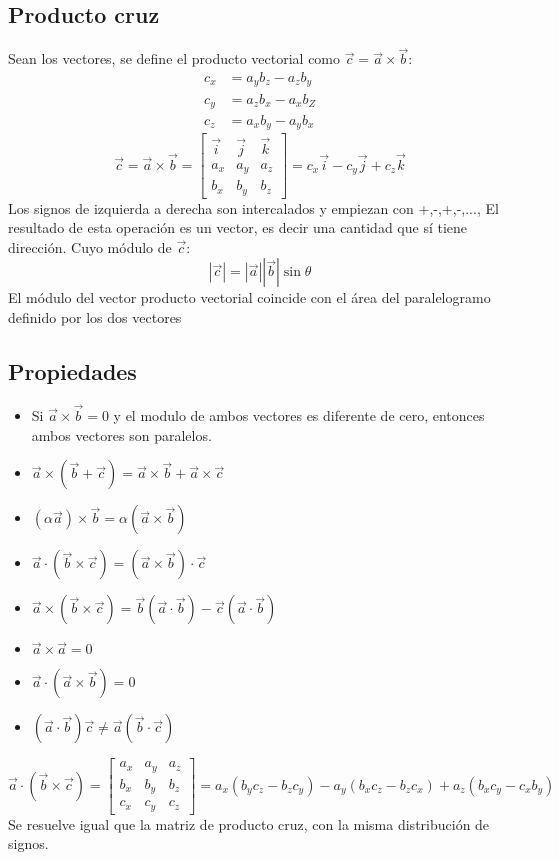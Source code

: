\documentclass[
	11pt, %
	fleqn, %
	a4paper, %
]{LegrandOrangeBook}
\begin{document}
\subsection{Producto cruz}
Sean los vectores, se define el producto vectorial como $\vec{c}=\vec{a}\times\vec{b}$:
\begin{align*}
c_x&=a_yb_z - a_zb_y\\
c_y&=a_zb_x - a_xb_Z\\
c_z&=a_xb_y - a_yb_x
\end{align*}
\begin{equation}
\vec{c}=\vec{a}\times\vec{b}=
\begin{bmatrix}
     \vec{i} & \vec{j} & \vec{k}\\
     a_x & a_y & a_z\\
     b_x & b_y & b_z
   \end{bmatrix}
=c_x\vec{i}-c_y\vec{j}+c_z\vec{k}
\end{equation}
Los signos de izquierda a derecha son intercalados y empiezan con +,-,+,-,...,
El resultado de esta operación es un vector, es decir una cantidad que sí tiene dirección. 
Cuyo módulo de $\vec{c}$:
\begin{equation}
|\vec{c}|=|\vec{a}||\vec{b}|\sin\theta
\end{equation}
El módulo del vector producto vectorial coincide con el área del paralelogramo definido por los dos vectores
\subsection{Propiedades}
\begin{itemize}
\item Si $\vec{a}\times\vec{b}=0$ y el modulo de ambos vectores es diferente de cero, entonces ambos vectores son paralelos.
\item $\vec{a}\times(\vec{b}+\vec{c})=\vec{a}\times\vec{b}+\vec{a}\times\vec{c}$
\item $(\alpha\vec{a})\times\vec{b}=\alpha(\vec{a}\times\vec{b})$
\item $\vec{a}\cdot(\vec{b}\times\vec{c})=(\vec{a}\times\vec{b})\cdot\vec{c}$
\item $\vec{a}\times(\vec{b}\times\vec{c})=\vec{b}(\vec{a}\cdot\vec{b}) - \vec{c}(\vec{a}\cdot\vec{b})$
\item $\vec{a}\times\vec{a}=0$
\item $\vec{a}\cdot(\vec{a}\times\vec{b})=0	$
\item $(\vec{a}\cdot\vec{b})\vec{c}\neq\vec{a}(\vec{b}\cdot\vec{c})$
\end{itemize}
\begin{equation}
\vec{a}\cdot(\vec{b}\times\vec{c})=
\begin{bmatrix}
     a_x & a_y & a_z\\
     b_x & b_y & b_z\\
     c_x & c_y & c_z
   \end{bmatrix}
=a_x(b_yc_z-b_zc_y)-a_y(b_xc_z-b_zc_x)+a_z(b_xc_y-c_xb_y)
\end{equation}
Se resuelve igual que la matriz de producto cruz, con la misma distribución de signos.
\end{document}
